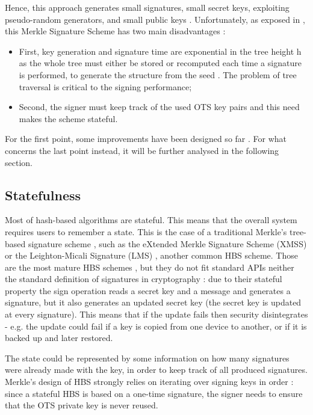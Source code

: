 \documentclass[a4paper,12pt]{article}
\def\eg{e.g.\xspace}
\begin{document}
Hence, this approach generates small signatures, small secret keys, exploiting pseudo-random generators, and small public keys \cite{1_sphincspaper}.
Unfortunately, as exposed in \cite{13_faultattacks}, this Merkle Signature Scheme has two main disadvantages \cite{53_hbs}:
\begin{itemize}
	\item First, key generation and signature time are exponential in the tree height h as the whole tree must either be stored or recomputed each time a signature is performed, to generate the structure from the seed \cite{1_sphincspaper}. The problem of tree traversal is critical to the signing performance;
	\item Second, the signer must keep track of the used OTS key pairs and this need makes the scheme stateful.
\end{itemize}

For the first point, some improvements have been designed so far \cite{1_sphincspaper}\cite{32_XMSS}. For what concerns the last point instead, it will be further analysed in the following section.

\subsection{Statefulness}
\label{sub:statefulness}

Most of hash-based algorithms are stateful. This means that the overall system requires users to remember a state. This is the case of a traditional Merkle's tree-based signature scheme \cite{2_SPHINCS+_round2}, such as the eXtended Merkle Signature Scheme (XMSS) \cite{33_RFC_XMSS} or the Leighton-Micali Signature (LMS) \cite{37_RFC_LMS}, another common HBS scheme.
Those are the most mature HBS schemes \cite{5_postquantum_signature_usecase}, but they do not fit standard APIs neither the standard definition of signatures in cryptography \cite{1_sphincspaper}: due to their stateful property the sign operation reads a secret key and a message and generates a signature, but it also generates an updated secret key (the secret key is updated at every signature). This means that if the update fails then security disintegrates \cite{1_sphincspaper} - \eg the update could fail if a key is copied from one device to another, or if it is backed up and later restored. 

The state could be represented by some information on how many signatures were already made with the key, in order to keep track of all produced signatures. Merkle's design of HBS strongly relies on iterating over signing keys in order \cite{3_SPHINCS_secondpaper}: since a stateful HBS is based on a one-time signature, the signer needs to ensure that the OTS private key is never reused.
\end{document}
